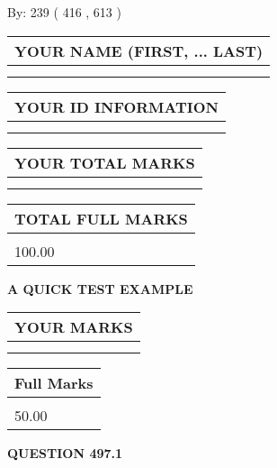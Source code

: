 \documentclass[12pt]{article}
\begin{document}
   
\hspace{1.0in} By: 
 239 ( 416 ,  613 )
   
   
   
   
\newpage 
\setcounter{page}{ 
   497001 } 
   
   
   
   
\noindent\begin{tabular}{|l|}
\hline
YOUR NAME (FIRST, ... LAST)  \\
\hline
 \\ 
 \\ 
\hline
\end{tabular}
\hspace{0.05in} \begin{tabular}{|l|}
\hline
 YOUR   ID   INFORMATION  \\
\hline
 \\ 
 \\ 
\hline
\end{tabular}
   
   
\vspace{0.2in}\noindent\begin{tabular}{|l|}
\hline
YOUR TOTAL MARKS  \\
\hline
 \\ 
 \\ 
\hline
\end{tabular}
\hspace{0.05in} \begin{tabular}{|l|}
\hline
TOTAL FULL MARKS  \\
\hline
 \\ 
100.00 \\
\hline
\end{tabular}
   
   
 \vspace{0.2in}
{\LARGE {\textbf{ A QUICK TEST EXAMPLE}}}
   
   
  
\vspace{0.2in}
  
\noindent\begin{tabular}{|l|}
\hline
 YOUR MARKS  \\
\hline
 \\ 
 \\ 
\hline
\end{tabular}
\hspace{0.05in} \begin{tabular}{|l|}
\hline
 Full Marks  \\
\hline
 \\ 
50.00 \\
\hline
\end{tabular}
{\textbf{\Large{QUESTION
497.1 
}}}
  
\end{document}
